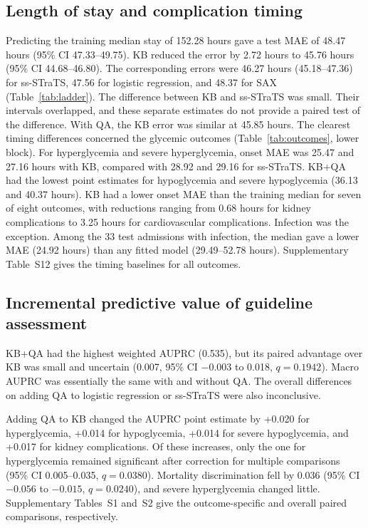 \subsection{Length of stay and complication timing}
Predicting the training median stay of 152.28 hours gave a test MAE of 48.47 hours (95\% CI 47.33--49.75). KB reduced the error by 2.72 hours to 45.76 hours (95\% CI 44.68--46.80). The corresponding errors were 46.27 hours (45.18--47.36) for ss-STraTS, 47.56 for logistic regression, and 48.37 for SAX (Table~\ref{tab:ladder}). The difference between KB and ss-STraTS was small. Their intervals overlapped, and these separate estimates do not provide a paired test of the difference. With QA, the KB error was similar at 45.85 hours.
The clearest timing differences concerned the glycemic outcomes (Table~\ref{tab:outcomes}, lower block). For hyperglycemia and severe hyperglycemia, onset MAE was 25.47 and 27.16 hours with KB, compared with 28.92 and 29.16 for ss-STraTS. KB+QA had the lowest point estimates for hypoglycemia and severe hypoglycemia (36.13 and 40.37 hours). KB had a lower onset MAE than the training median for seven of eight outcomes, with reductions ranging from 0.68 hours for kidney complications to 3.25 hours for cardiovascular complications. Infection was the exception. Among the 33 test admissions with infection, the median gave a lower MAE (24.92 hours) than any fitted model (29.49--52.78 hours). Supplementary Table~S12 gives the timing baselines for all outcomes.

\subsection{Incremental predictive value of guideline assessment}
\label{sec:results-qa}
KB+QA had the highest weighted AUPRC (0.535), but its paired advantage over KB was small and uncertain (0.007, 95\% CI $-0.003$ to 0.018, $q=0.1942$). Macro AUPRC was essentially the same with and without QA. The overall differences on adding QA to logistic regression or ss-STraTS were also inconclusive.

Adding QA to KB changed the AUPRC point estimate by +0.020 for hyperglycemia, +0.014 for hypoglycemia, +0.014 for severe hypoglycemia, and +0.017 for kidney complications. Of these increases, only the one for hyperglycemia remained significant after correction for multiple comparisons (95\% CI 0.005--0.035, $q=0.0380$). Mortality discrimination fell by 0.036 (95\% CI $-0.056$ to $-0.015$, $q=0.0240$), and severe hyperglycemia changed little. Supplementary Tables~S1 and~S2 give the outcome-specific and overall paired comparisons, respectively.

